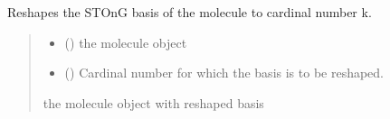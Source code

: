 \documentclass[letterpaper,10pt,english]{sphinxmanual}
\begin{document}
\begin{fulllineitems}
\label{\detokenize{api:MSTOOptpar.BasisReshape}}
\pysigstartsignatures
\pysiglinewithargsret
{}
{\sphinxparamcomma {}}
{}
\pysigstopsignatures
\sphinxAtStartPar
Reshapes the STO\sphinxhyphen{}nG basis of the molecule to cardinal number k.
\begin{quote}\begin{description}
\begin{itemize}
\item {} 
\sphinxAtStartPar
{} () \textendash{} the  molecule object

\item {} 
\sphinxAtStartPar
{} () \textendash{} Cardinal number for which the basis is to be reshaped.

\end{itemize}

\sphinxAtStartPar
the  molecule object with reshaped basis

\sphinxAtStartPar
{}

\end{description}\end{quote}


\end{fulllineitems}
\end{document}
